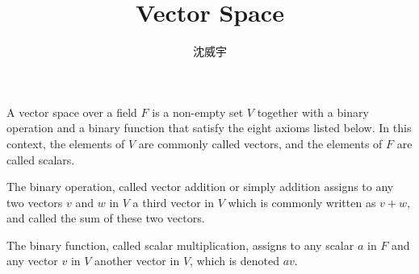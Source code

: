 \documentclass[a4paper,12pt]{article}
\begin{document}
\title{Vector Space}
\author{沈威宇}
\date{\temtoday}
\titletocdoc
{}
A vector space over a field $F$ is a non-empty set $V$ together with a binary operation and a binary function that satisfy the eight axioms listed below. In this context, the elements of $V$ are commonly called vectors, and the elements of $F$ are called scalars.

The binary operation, called vector addition or simply addition assigns to any two vectors $v$ and $w$ in $V$ a third vector in $V$ which is commonly written as $v + w$, and called the sum of these two vectors.

The binary function, called scalar multiplication, assigns to any scalar $a$ in $F$ and any vector $v$ in $V$ another vector in $V$, which is denoted $av$.
\end{document}
